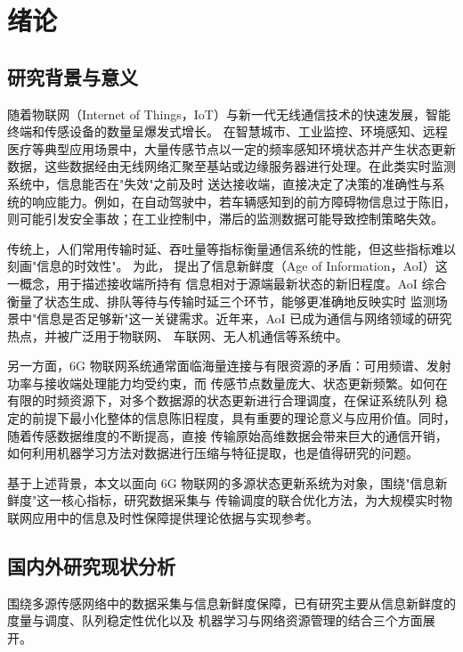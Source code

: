 
\chapter{绪\quad 论}\label{chap:intro}

\section{研究背景与意义}

随着物联网（Internet of Things，IoT）与新一代无线通信技术的快速发展，智能终端和传感设备的数量呈爆发式增长。
在智慧城市、工业监控、环境感知、远程医疗等典型应用场景中，大量传感节点以一定的频率感知环境状态并产生状态更新
数据，这些数据经由无线网络汇聚至基站或边缘服务器进行处理。在此类实时监测系统中，信息能否在"失效"之前及时
送达接收端，直接决定了决策的准确性与系统的响应能力。例如，在自动驾驶中，若车辆感知到的前方障碍物信息过于陈旧，
则可能引发安全事故；在工业控制中，滞后的监测数据可能导致控制策略失效。

传统上，人们常用传输时延、吞吐量等指标衡量通信系统的性能，但这些指标难以刻画"信息的时效性"。
为此，\cite{2015-Pappas-ICC} 提出了信息新鲜度（Age of Information，AoI）这一概念，用于描述接收端所持有
信息相对于源端最新状态的新旧程度。AoI 综合衡量了状态生成、排队等待与传输时延三个环节，能够更准确地反映实时
监测场景中"信息是否足够新"这一关键需求。近年来，AoI 已成为通信与网络领域的研究热点，并被广泛用于物联网、
车联网、无人机通信等系统中\cite{2022-Jiao-TVT}。

另一方面，6G 物联网系统通常面临海量连接与有限资源的矛盾：可用频谱、发射功率与接收端处理能力均受约束，而
传感节点数量庞大、状态更新频繁。如何在有限的时频资源下，对多个数据源的状态更新进行合理调度，在保证系统队列
稳定的前提下最小化整体的信息陈旧程度，具有重要的理论意义与应用价值。同时，随着传感数据维度的不断提高，直接
传输原始高维数据会带来巨大的通信开销，如何利用机器学习方法对数据进行压缩与特征提取，也是值得研究的问题。

基于上述背景，本文以面向 6G 物联网的多源状态更新系统为对象，围绕"信息新鲜度"这一核心指标，研究数据采集与
传输调度的联合优化方法，为大规模实时物联网应用中的信息及时性保障提供理论依据与实现参考。

\section{国内外研究现状分析}

围绕多源传感网络中的数据采集与信息新鲜度保障，已有研究主要从信息新鲜度的度量与调度、队列稳定性优化以及
机器学习与网络资源管理的结合三个方面展开。

